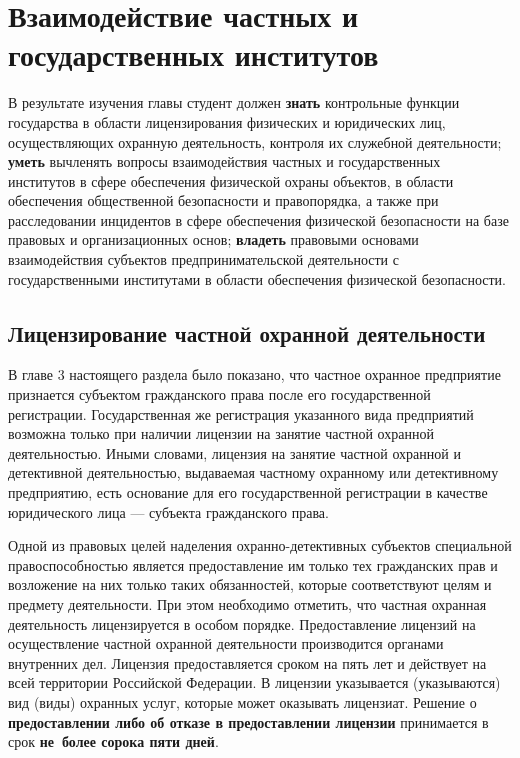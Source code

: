\documentclass[a4paper,12pt,fleqn]{article} %
\begin{document}
\section{Взаимодействие частных и государственных институтов}

\begin{tcolorbox}[colback=blue!40!red!10!,colframe=blue!40!red]
В результате изучения главы студент должен \textbf{знать} контрольные функции государства в области лицензирования физических и юридических лиц, осуществляющих охранную деятельность, контроля их служебной деятельности; \textbf{уметь} вычленять  вопросы взаимодействия частных и государственных институтов в сфере обеспечения физической охраны объектов, в области обеспечения общественной безопасности и правопорядка, а также при расследовании инцидентов в сфере обеспечения физической безопасности на базе правовых и организационных основ; \textbf{владеть} правовыми основами взаимодействия субъектов предпринимательской деятельности с государственными институтами в области обеспечения физической безопасности.
\end{tcolorbox}

\subsection{Лицензирование частной охранной деятельности}


В главе 3 настоящего раздела было показано, что частное охранное предприятие признается субъектом гражданского права после его государственной регистрации. Государственная же регистрация указанного вида предприятий возможна только при наличии лицензии на занятие частной охранной деятельностью. Иными словами, лицензия на занятие частной охранной и детективной деятельностью, выдаваемая частному охранному или детективному предприятию, есть основание для его государственной регистрации в качестве юридического лица --- субъекта гражданского права.

Одной из правовых целей наделения охранно-детективных субъектов специальной правоспособностью является предоставление им только тех гражданских прав и возложение на них только таких обязанностей, которые соответствуют целям и предмету деятельности. При этом необходимо отметить, что частная охранная деятельность лицензируется в особом порядке. 	Предоставление лицензий на осуществление частной охранной деятельности производится органами внутренних дел. Лицензия предоставляется сроком на пять лет и действует на всей территории Российской Федерации. В лицензии указывается (указываются) вид (виды) охранных услуг, которые может оказывать лицензиат. Решение о \textbf{предоставлении либо об отказе в предоставлении лицензии} принимается в срок \textbf{не~более сорока пяти дней}.
\end{document}
